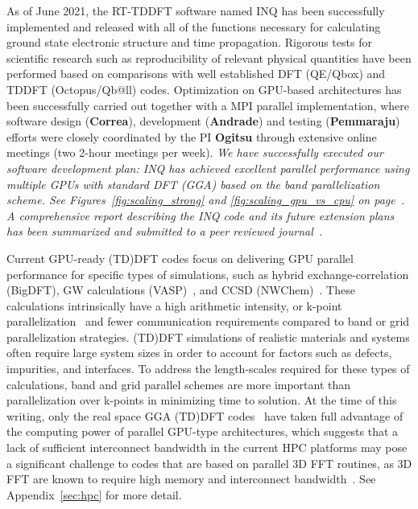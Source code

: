 As of June 2021, the RT-TDDFT software named INQ has been successfully implemented and released with all of the functions necessary for calculating ground state electronic structure and time propagation. Rigorous tests for scientific research such as reproducibility of relevant physical quantities have been performed based on comparisons with well established DFT (QE/Qbox) and TDDFT (Octopus/Qb@ll) codes. Optimization on GPU-based architectures has been successfully carried out together with a MPI parallel implementation, where software design ({\bf Correa}), development ({\bf Andrade}) and testing ({\bf Pemmaraju}) efforts were closely coordinated by the PI {\bf Ogitsu} through extensive online meetings (two 2-hour meetings per week). \emph{ We have successfully executed our software development plan: INQ has achieved excellent parallel performance using multiple GPUs with standard DFT (GGA) based on the band parallelization scheme. See Figures~\ref{fig:scaling_strong} and \ref{fig:scaling_gpu_vs_cpu} on page~\pageref{fig:scaling_strong}. A comprehensive report describing the INQ code and its future extension plans has been summarized and submitted to a peer reviewed journal~\cite{andrade2021inq}.} 

Current GPU-ready (TD)DFT codes focus on delivering GPU parallel performance for specific types of simulations, such as hybrid exchange-correlation (BigDFT)\cite{BigDFT2018},  GW calculations (VASP)~\cite{vasp2012,vasp2012b,vasp2018,vasp2019}, and CCSD (NWChem)~\cite{NWChem2013}. These calculations intrinsically have a high arithmetic intensity, or k-point parallelization~\cite{QE2017,QE2020} and fewer communication requirements compared to band or grid parallelization strategies. (TD)DFT simulations of realistic materials and systems often require large system sizes in order to account for factors such as defects, impurities, and interfaces. To address the length-scales required for these types of calculations, band and grid parallel schemes are more important than parallelization over k-points in minimizing time to solution. At the time of this writing, only the real space GGA (TD)DFT codes~\cite{andrade2012time,andrade2013real,SparcX2021} have taken full advantage of the computing power of parallel GPU-type architectures, which suggests that a lack of sufficient interconnect bandwidth in the current HPC platforms may pose a significant challenge to codes that are based on parallel 3D FFT routines, as 3D FFT are known to require high memory and interconnect bandwidth~\cite{heFFTe2020}. See Appendix~\ref{sec:hpc} for more detail.

